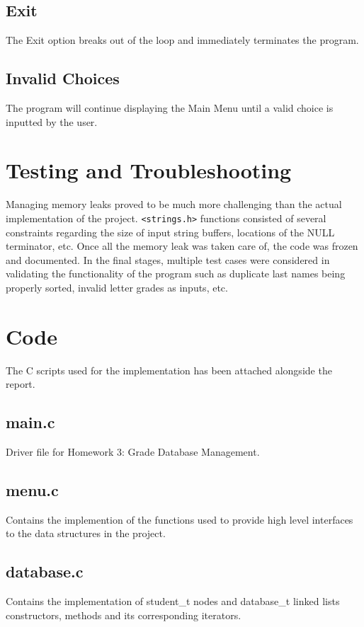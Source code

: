 \documentclass[usletter, 12pt]{article}
\begin{document}
        \subsection{Exit} The Exit option breaks out of the loop and
        immediately terminates the program.

        \subsection{Invalid Choices} The program will continue displaying the
        Main Menu until a valid choice is inputted by the user.

    \section{Testing and Troubleshooting} Managing memory leaks proved to be
    much more challenging than the actual implementation of the project.
    \texttt{<strings.h>} functions consisted of several constraints regarding
    the size of input string buffers, locations of the NULL terminator, etc.
    Once all the memory leak was taken care of, the code was frozen and
    documented. In the final stages, multiple test cases were considered in
    validating the functionality of the program such as duplicate last names
    being properly sorted, invalid letter grades as inputs, etc.

    \section{Code} The C scripts used for the implementation has been attached
    alongside the report.

        \subsection{main.c} Driver file for Homework 3: Grade Database
        Management.

        \subsection{menu.c} Contains the implemention of the functions used to
        provide high level interfaces to the data structures in the project.

        \subsection{database.c} Contains the implementation of student\_t nodes
        and database\_t linked lists constructors, methods and its
        corresponding iterators.
\end{document}
